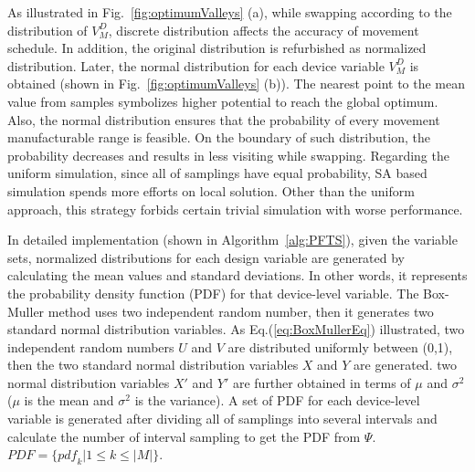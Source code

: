   As illustrated in Fig.~\ref{fig:optimumValleys} (a), while swapping according to the distribution of $V^D_M$, discrete distribution affects the accuracy of movement schedule. In addition, the original distribution is refurbished as normalized distribution. Later, the normal distribution for each device variable $V^D_M$ is obtained (shown in Fig.~\ref{fig:optimumValleys} (b)). The nearest point to the mean value from samples symbolizes higher potential to reach the global optimum. Also, the normal distribution ensures that the probability of every movement manufacturable range is feasible. On the boundary of such distribution, the probability decreases and results in less visiting while swapping. Regarding the uniform simulation, since all of samplings have equal probability, SA based simulation spends more efforts on local solution. Other than the uniform approach, this strategy forbids certain trivial simulation with worse performance.  


  In detailed implementation (shown in Algorithm~\ref{alg:PFTS}), given the variable sets, normalized distributions for each design variable are generated by calculating the mean values and standard deviations. In other words, it represents the probability density function (PDF) for that device-level variable. The Box-Muller method \cite{BoxMuller1958AMS} uses two independent random number, then it generates two standard normal distribution variables. As Eq.(\ref{eq:BoxMullerEq}) illustrated, two independent random numbers $U$ and $V$ are distributed uniformly between (0,1), then the two standard normal distribution variables $X$ and $Y$ are generated. two normal distribution variables $X'$ and $Y'$ are further obtained in terms of $\mu$ and $\sigma^2$ ($\mu$ is the mean and $\sigma^2$ is the variance). A set of PDF for each device-level variable is generated after dividing all of samplings into several intervals and calculate the number of interval sampling to get the PDF from $\Psi$. $PDF = \{ {pdf}_k | 1 \leq k \leq |M|\}$.
    

